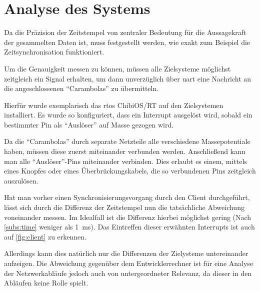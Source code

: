\section{Analyse des Systems}
Da die Präzision der Zeitstempel von zentraler Bedeutung für die
Aussagekraft der gesammelten Daten ist, muss festgestellt werden, wie exakt zum Beispiel die
Zeitsynchronisation funktioniert.

Um die Genauigkeit messen zu können, müssen alle Zielsysteme möglichst
zeitgleich ein Signal erhalten, um dann unverzüglich über \gls{uart} eine
Nachricht an die angeschlossenen "`Carambolas"' zu übermitteln.

Hierfür wurde exemplarisch das \gls{rtos} ChibiOS/RT\cite{CHIB} auf den
Zielsystemen installiert. Es wurde so konfiguriert, dass ein Interrupt ausgelöst
wird, sobald ein bestimmter Pin als "`Auslöser"' auf Masse gezogen wird.

Da die "`Carambolas"' durch separate Netzteile alle verschiedene Massepotentiale
haben, müssen diese zuerst miteinander verbunden werden. Anschließend kann man
alle "`Auslöser"'-Pins miteinander verbinden. Dies erlaubt es einem, mittels
eines Knopfes oder eines Überbrückungskabels, die so verbundenen Pins zeitgleich
auszulösen.

Hat man vorher einen Synchronisierungsvorgang durch den Client durchgeführt,
lässt sich durch die Differenz der Zeitstempel nun die tatsächliche Abweichung
voneinander messen. Im Idealfall ist die Differenz hierbei möglichst gering
(Nach \autoref{subs:time} weniger als \SI{1}{\milli\second}). Das Eintreffen
dieser erwähnten Interrupts ist auch auf \autoref{fig:client} zu erkennen.

Allerdings kann dies natürlich nur die Differenzen der Zielysteme untereinander
aufzeigen. Die Abweichung gegenüber dem Entwicklerrechner ist für eine Analyse
der Netzwerkabläufe jedoch auch von untergeordneter Relevanz, da dieser in den
Abläufen keine Rolle spielt.


